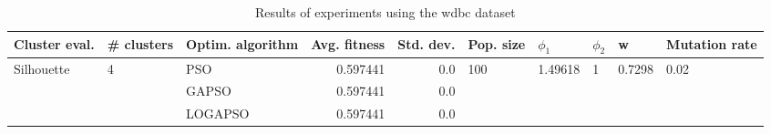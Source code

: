 \begin{table}
\centering
\caption{Results of experiments using the wdbc dataset}
\begin{tabular}{lllrrlllll}
\toprule
              Cluster eval. &        \# clusters & Optim. algorithm &  Avg. fitness &  Std. dev. &            Pop. size &               $\phi_{1}$ &         $\phi_{2}$ &                       w &         Mutation rate \\
\midrule
\multirow{3}{*}{Silhouette} & \multirow{3}{*}{4} &              PSO &      0.597441 &        0.0 & \multirow{3}{*}{100} & \multirow{3}{*}{1.49618} & \multirow{3}{*}{1} & \multirow{3}{*}{0.7298} & \multirow{3}{*}{0.02} \\
                            &                    &            GAPSO &      0.597441 &        0.0 &                      &                          &                    &                         &                       \\
                            &                    &          LOGAPSO &      0.597441 &        0.0 &                      &                          &                    &                         &                       \\
\bottomrule
\end{tabular}
\end{table}
